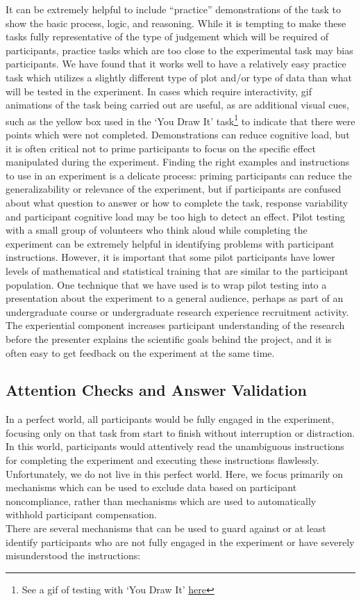 \documentclass[
  10pt,
  letterpaper,
  DIV=11,
  numbers=noendperiod]{scrartcl}
\begin{document}
It can be extremely helpful to include ``practice'' demonstrations of
the task to show the basic process, logic, and reasoning. While it is
tempting to make these tasks fully representative of the type of
judgement which will be required of participants, practice tasks which
are too close to the experimental task may bias participants. We have
found that it works well to have a relatively easy practice task which
utilizes a slightly different type of plot and/or type of data than what
will be tested in the experiment. In cases which require interactivity,
gif animations of the task being carried out are useful, as are
additional visual cues, such as the yellow box used in the `You Draw It'
task\footnote{See a gif of testing with `You Draw It'
  \href{https://i.imgur.com/GM5YSen.gif}{here}} to indicate that there
were points which were not completed. Demonstrations can reduce
cognitive load, but it is often critical not to prime participants to
focus on the specific effect manipulated during the experiment. Finding
the right examples and instructions to use in an experiment is a
delicate process: priming participants can reduce the generalizability
or relevance of the experiment, but if participants are confused about
what question to answer or how to complete the task, response
variability and participant cognitive load may be too high to detect an
effect. Pilot testing with a small group of volunteers who think aloud
while completing the experiment can be extremely helpful in identifying
problems with participant instructions. However, it is important that
some pilot participants have lower levels of mathematical and
statistical training that are similar to the participant population. One
technique that we have used is to wrap pilot testing into a presentation
about the experiment to a general audience, perhaps as part of an
undergraduate course or undergraduate research experience recruitment
activity. The experiential component increases participant understanding
of the research before the presenter explains the scientific goals
behind the project, and it is often easy to get feedback on the
experiment at the same time.

\subsection{Attention Checks and Answer
Validation}\label{attention-checks-and-answer-validation}

In a perfect world, all participants would be fully engaged in the
experiment, focusing only on that task from start to finish without
interruption or distraction. In this world, participants would
attentively read the unambiguous instructions for completing the
experiment and executing these instructions flawlessly. Unfortunately,
we do not live in this perfect world. Here, we focus primarily on
mechanisms which can be used to exclude data based on participant
noncompliance, rather than mechanisms which are used to automatically
withhold participant compensation.\\
There are several mechanisms that can be used to guard against or at
least identify participants who are not fully engaged in the experiment
or have severely misunderstood the instructions:
\end{document}
